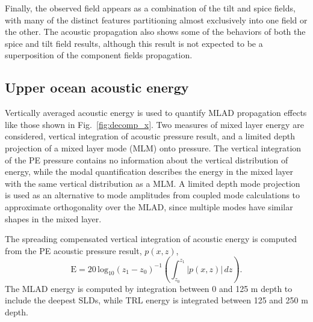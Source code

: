 \documentclass[preprint,NumberedRefs]{JASA}
\begin{document}
Finally, the observed field appears as a combination of the tilt and spice fields, with many of the distinct features partitioning almost exclusively into one field or the other. The acoustic propagation also shows some of the behaviors of both the spice and tilt field results, although this result is not expected to be a superposition of the component fields propagation.

\subsection{Upper ocean acoustic energy}\label{ssec:bg}
Vertically averaged acoustic energy is used to quantify MLAD propagation effects like those shown in Fig.~\ref{fig:decomp_x}. Two measures of mixed layer energy are considered, vertical integration of acoustic pressure result, and a limited depth projection of a mixed layer mode (MLM) onto pressure. The vertical integration of the PE pressure contains no information about the vertical distribution of energy, while the modal quantification describes the energy in the mixed layer with the same vertical distribution as a MLM. A limited depth mode projection is used as an alternative to mode amplitudes from coupled mode calculations to approximate orthogonality over the MLAD, since multiple modes have similar shapes in the mixed layer.

The spreading compensated vertical integration of acoustic energy is computed from the PE acoustic pressure result, $p(x, z)$,
\begin{equation}
    \textrm{E} = 20 \, \textrm{log}_{10} (z_1 - z_0)^{-1} \left( \int^{z_1}_{z_0} \left| p(x, z) \right| \,  dz \right).
    \label{eq:int_eng}
\end{equation}
The MLAD energy is computed by integration between 0 and 125 m depth to include the deepest SLDs, while TRL energy is integrated between 125 and 250 m depth.
\end{document}
